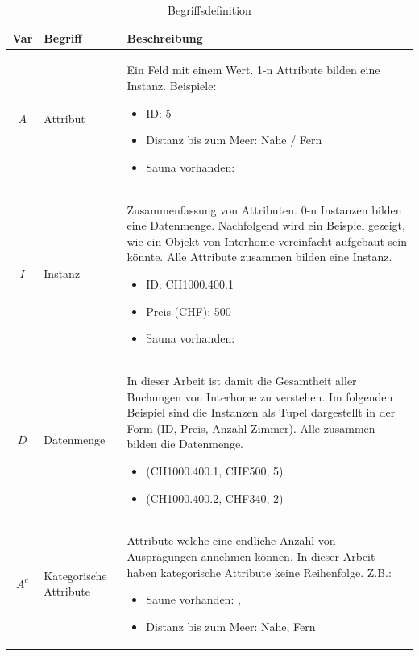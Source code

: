 \begin{table}[H] 
	\caption{Begriffsdefinition}
	\centering
	\label{fig:einletung:begriffsdefinition:1}
	\begin{tabular}{ | c | C{2.5cm} | p{10cm} |} 
		\hline 
		\bfseries Var & 
		\bfseries Begriff & 
		\bfseries Beschreibung \\ \hline 
		$A$ & Attribut & Ein Feld mit einem Wert. 1-n Attribute bilden eine Instanz. Beispiele:\
			\begin{itemize}
			\item ID: 5
			\item Distanz bis zum Meer: Nahe / Fern
			\item Sauna vorhanden: \checkmark
			\end{itemize} \\ \hline 
		$I$ & Instanz & Zusammenfassung von Attributen. 0-n Instanzen bilden eine Datenmenge. Nachfolgend wird ein Beispiel gezeigt, wie ein Objekt von Interhome vereinfacht aufgebaut sein könnte. Alle Attribute zusammen bilden eine Instanz.\
			\begin{itemize}
			\item ID: CH1000.400.1
			\item Preis (CHF): 500
			\item Sauna vorhanden: \checkmark
			\end{itemize} \\ \hline 
		$D$ & Datenmenge & In dieser Arbeit ist damit die Gesamtheit aller Buchungen von Interhome zu verstehen. Im folgenden Beispiel sind die Instanzen als Tupel dargestellt in der Form (ID, Preis, Anzahl Zimmer). Alle zusammen bilden die Datenmenge.\
			\begin{itemize}
			\item (CH1000.400.1, CHF500, 5)
			\item (CH1000.400.2, CHF340, 2)
			\end{itemize}\\ \hline 
		$A^c$ & Kategorische Attribute & Attribute welche eine endliche Anzahl von Ausprägungen annehmen können. In dieser Arbeit haben kategorische Attribute keine Reihenfolge. Z.B.: \
			\begin{itemize}
			\item Saune vorhanden: \checkmark, 
			\item Distanz bis zum Meer: Nahe, Fern

\end{itemize}
\end{tabular}
\end{table}
